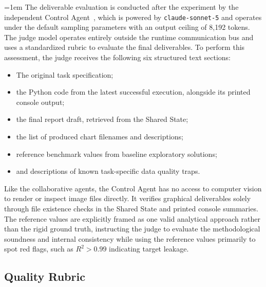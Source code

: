 {
\emergencystretch=1em
The deliverable evaluation is conducted after the experiment by the independent Control Agent~\cite{zheng2023judgingllmasajudgemtbenchchatbot}, which is powered by \texttt{claude-sonnet-5} and operates under the default sampling parameters with an output ceiling of 8,192 tokens.
The judge model operates entirely outside the runtime communication bus and uses a standardized rubric to evaluate the final deliverables.
To perform this assessment, the judge receives the following six structured text sections:
\par}
\begin{itemize}
    \item The original task specification;
    \item the Python code from the latest successful execution, alongside its printed console output;
    \item the final report draft, retrieved from the Shared State;
    \item the list of produced chart filenames and descriptions;
    \item reference benchmark values from baseline exploratory solutions;
    \item and descriptions of known task-specific data quality traps.
\end{itemize}
Like the collaborative agents, the Control Agent has no access to computer vision to render or inspect image files directly. 
It verifies graphical deliverables solely through file existence checks in the Shared State and printed console summaries.
The reference values are explicitly framed as one valid analytical approach rather than the rigid ground truth, instructing the judge to evaluate the methodological soundness and internal consistency while using the reference values primarily to spot red flags, such as $R^2 > 0.99$ indicating target leakage.

\subsection{Quality Rubric}
\label{subsec:quality-rubric}

